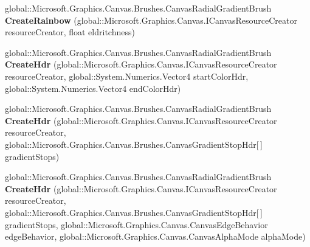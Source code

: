 \begin{DoxyCompactItemize}
\item 
\mbox{\label{interface_microsoft_1_1_graphics_1_1_canvas_1_1_brushes_1_1_i_canvas_radial_gradient_brush_statics_a7dd980a2771ddc006a4a8a3c925e1be7}} 
global\+::\+Microsoft.\+Graphics.\+Canvas.\+Brushes.\+Canvas\+Radial\+Gradient\+Brush {\bfseries Create\+Rainbow} (global\+::\+Microsoft.\+Graphics.\+Canvas.\+I\+Canvas\+Resource\+Creator resource\+Creator, float eldritchness)
\item 
\mbox{\label{interface_microsoft_1_1_graphics_1_1_canvas_1_1_brushes_1_1_i_canvas_radial_gradient_brush_statics_a33c22a712d4ae1fd59611737c9f40f6b}} 
global\+::\+Microsoft.\+Graphics.\+Canvas.\+Brushes.\+Canvas\+Radial\+Gradient\+Brush {\bfseries Create\+Hdr} (global\+::\+Microsoft.\+Graphics.\+Canvas.\+I\+Canvas\+Resource\+Creator resource\+Creator, global\+::\+System.\+Numerics.\+Vector4 start\+Color\+Hdr, global\+::\+System.\+Numerics.\+Vector4 end\+Color\+Hdr)
\item 
\mbox{\label{interface_microsoft_1_1_graphics_1_1_canvas_1_1_brushes_1_1_i_canvas_radial_gradient_brush_statics_a875dc22871a8814a201d278d00a3844f}} 
global\+::\+Microsoft.\+Graphics.\+Canvas.\+Brushes.\+Canvas\+Radial\+Gradient\+Brush {\bfseries Create\+Hdr} (global\+::\+Microsoft.\+Graphics.\+Canvas.\+I\+Canvas\+Resource\+Creator resource\+Creator, global\+::\+Microsoft.\+Graphics.\+Canvas.\+Brushes.\+Canvas\+Gradient\+Stop\+Hdr\mbox{[}$\,$\mbox{]} gradient\+Stops)
\item 
\mbox{\label{interface_microsoft_1_1_graphics_1_1_canvas_1_1_brushes_1_1_i_canvas_radial_gradient_brush_statics_aa2aa4c9e128daa190430d9e6057029c7}} 
global\+::\+Microsoft.\+Graphics.\+Canvas.\+Brushes.\+Canvas\+Radial\+Gradient\+Brush {\bfseries Create\+Hdr} (global\+::\+Microsoft.\+Graphics.\+Canvas.\+I\+Canvas\+Resource\+Creator resource\+Creator, global\+::\+Microsoft.\+Graphics.\+Canvas.\+Brushes.\+Canvas\+Gradient\+Stop\+Hdr\mbox{[}$\,$\mbox{]} gradient\+Stops, global\+::\+Microsoft.\+Graphics.\+Canvas.\+Canvas\+Edge\+Behavior edge\+Behavior, global\+::\+Microsoft.\+Graphics.\+Canvas.\+Canvas\+Alpha\+Mode alpha\+Mode)

\end{DoxyCompactItemize}
